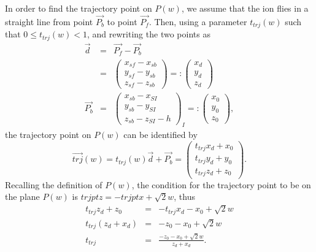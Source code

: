 \documentclass{article}
\begin{document}
In order to find the trajectory point on $P(w)$, we assume that the ion flies in a straight line from point $\vec{P_b}$ to point $\vec{P_f}$. Then, using a parameter $t_{trj}(w)$ such that $0 \le t_{trj}(w) < 1$, and rewriting the two points as
\begin{eqnarray*}
\vec{d} & = & \vec{P_f} - \vec{P_b} \\
& = & \left(
\begin{array}{c}
	x_{sf} - x_{sb} \\
	y_{sf} - y_{sb} \\
	z_{sf} - z_{sb}
\end{array} \right) =: \left(
\begin{array}{c}
	x_d \\
	y_d \\
	z_d
\end{array} \right) \\
\vec{P_b} & = & \left(
\begin{array}{c}
	x_{sb} - x_{SI} \\
	y_{sb} - y_{SI} \\
	z_{sb} - z_{SI} - h
\end{array} \right)_I =: \left(
\begin{array}{c}
	x_0 \\
	y_0 \\
	z_0
\end{array} \right),
\end{eqnarray*}
the trajectory point on $P(w)$ can be identified by
\begin{equation*}
\vec{trj}(w) = t_{trj}(w) \vec{d} + \vec{P_b} = \left(
\begin{array}{c}
	t_{trj} x_d + x_0 \\
	t_{trj} y_d + y_0 \\
	t_{trj} z_d + z_0
\end{array} \right).
\end{equation*}
Recalling the definition of $P(w)$, the condition for the trajectory point to be on the plane $P(w)$ is $trjptz = -trjptx + \sqrt{2}w$, thus
\begin{eqnarray*}
t_{trj} z_d + z_0 & = & -t_{trj} x_d - x_0 + \sqrt{2}w \\
t_{trj} (z_d + x_d) & = & -z_0 - x_0 + \sqrt{2}w \\
t_{trj} & = & \frac{-z_0-x_0+\sqrt{2}w}{z_d+x_d}. \\
\end{eqnarray*}
\end{document}

